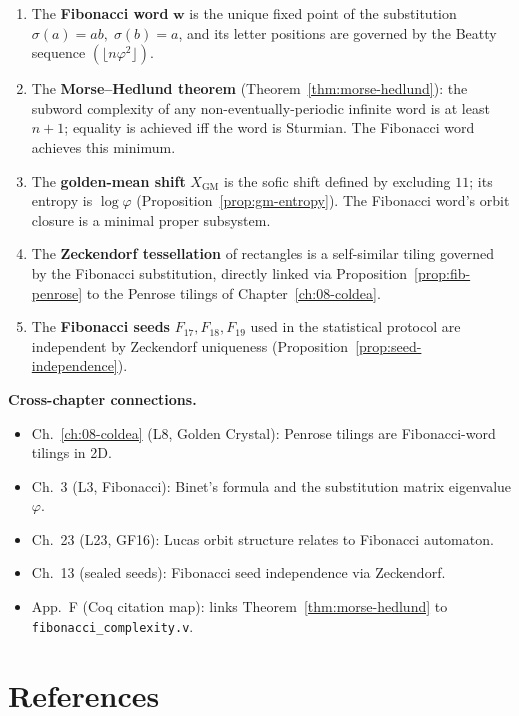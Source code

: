 \begin{enumerate}
  \item The \textbf{Fibonacci word} \(\mathbf{w}\) is the unique
    fixed point of the substitution \(\sigma(a)=ab,\;\sigma(b)=a\),
    and its letter positions are governed by the Beatty sequence
    \((\lfloor n\varphi^2\rfloor)\).
  \item The \textbf{Morse--Hedlund theorem} (Theorem~\ref{thm:morse-hedlund}):
    the subword complexity of any non-eventually-periodic infinite word
    is at least \(n+1\); equality is achieved iff the word is Sturmian.
    The Fibonacci word achieves this minimum.
  \item The \textbf{golden-mean shift} \(X_{\mathrm{GM}}\) is the
    sofic shift defined by excluding \(11\); its entropy is
    \(\log\varphi\) (Proposition~\ref{prop:gm-entropy}).  The
    Fibonacci word's orbit closure is a minimal proper subsystem.
  \item The \textbf{Zeckendorf tessellation} of rectangles is a
    self-similar tiling governed by the Fibonacci substitution,
    directly linked via Proposition~\ref{prop:fib-penrose} to the
    Penrose tilings of Chapter~\ref{ch:08-coldea}.
  \item The \textbf{Fibonacci seeds} \(F_{17},F_{18},F_{19}\) used in
    the statistical protocol are independent by Zeckendorf uniqueness
    (Proposition~\ref{prop:seed-independence}).
\end{enumerate}

\medskip
\textbf{Cross-chapter connections.}
\begin{itemize}
  \item Ch.~\ref{ch:08-coldea} (L8, Golden Crystal): Penrose tilings
    are Fibonacci-word tilings in 2D.
  \item Ch.~3 (L3, Fibonacci): Binet's formula and the substitution
    matrix eigenvalue \(\varphi\).
  \item Ch.~23 (L23, GF16): Lucas orbit structure relates to
    Fibonacci automaton.
  \item Ch.~13 (sealed seeds): Fibonacci seed independence via
    Zeckendorf.
  \item App.~F (Coq citation map): links Theorem~\ref{thm:morse-hedlund}
    to \texttt{fibonacci\_complexity.v}.
\end{itemize}

\section{References}
\label{sec:ch19-refs}

